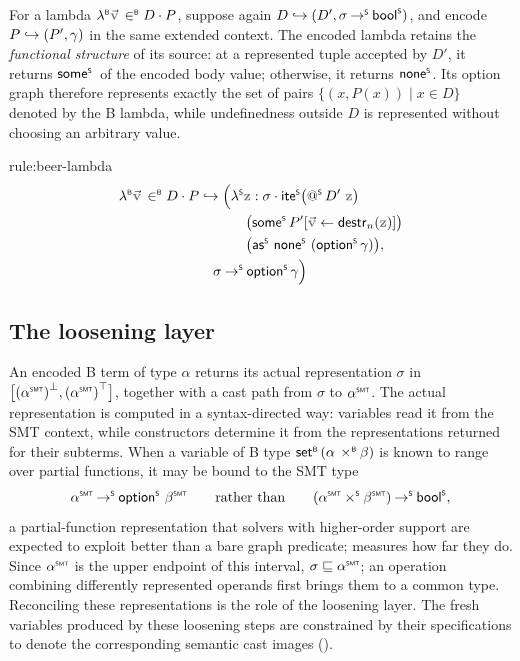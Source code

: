 For a lambda \(\lambdaB \vec{\var{v}} \inB D \cdot P\), suppose again \(D \mathrel{\hookrightarrow} (D', \sigma \mathbin{\to^{\scriptscriptstyle{\mathsf{S}}}} \mathsf{bool}^{\scriptscriptstyle{\mathsf{S}}})\), and encode \(P \mathrel{\hookrightarrow} (P', \gamma)\) in the same extended context.
The encoded lambda retains the \emph{functional structure} of its source: at a represented tuple accepted by \(D'\), it returns \(\mathord{\mathsf{some}^{\scriptscriptstyle{\mathsf{S}}}}\,\) of the encoded body value; otherwise, it returns \(\mathord{\mathsf{none}^{\scriptscriptstyle{\mathsf{S}}}}\).
Its option graph therefore represents exactly the set of pairs \(\{(x,P(x))\mid x\in D\}\) denoted by the B lambda, while undefinedness outside \(D\) is represented without choosing an arbitrary value.
\begin{encrule}[lambda]{rule:beer-lambda}
\[
  \begin{aligned}
    \lambdaB \vec{\var{v}} \inB D \cdot P
      &\encto \Bigl(\lamS \var{z} : \sigma \cdot \iteS\bigl(\appS{D'}{\var{z}}\bigr)\\
      &\mkern60mu \bigl(\someS P'[\vec{\var{v}} \leftarrow \mathsf{destr}_n(\var{z})]\bigr)\\
      &\mkern60mu \bigl(\asS\ \noneS\ (\optS\gamma)\bigr),\\
      &\quad\sigma \toS \optS\gamma\Bigr)
  \end{aligned}
\]
\end{encrule}

\subsection{The loosening layer}
\label{sec:beer-rules-cast}

An encoded B term of type \(\alpha\) returns its actual representation \(\sigma\) in
\(\bigl[\lgf{(\toSMT{\alpha})},\mgf{(\toSMT{\alpha})}\bigr]\), together with a cast path from \(\sigma\) to \(\toSMT{\alpha}\).
The actual representation is computed in a syntax-directed way: variables read it from the SMT context, while constructors determine it from the representations returned for their subterms.
When a variable of B type \(\mathsf{set}^{\scriptscriptstyle{\mathsf{B}}}\,(\alpha \mathbin{\,\times^{\scriptscriptstyle{\mathsf{B}}}} \beta)\) is known to range over partial functions, it may be bound to the SMT type
\[
  \toSMT{\alpha} \toS \optS\,\toSMT{\beta}
  \qquad\text{rather than}\qquad
  (\toSMT{\alpha} \timesS \toSMT{\beta}) \toS \boolS,
\]
a partial-function representation that solvers with higher-order support are expected to exploit better than a bare graph predicate;  measures how far they do.
Since \(\toSMT{\alpha}\) is the upper endpoint of this interval, \(\castable{\sigma}{\toSMT{\alpha}}\); an operation combining differently represented operands first brings them to a common type.
Reconciling these representations is the role of the loosening layer.
The fresh variables produced by these loosening steps are constrained by their specifications to denote the corresponding semantic cast images ().

